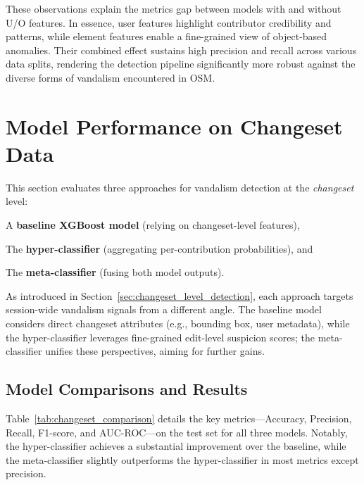 \documentclass[
    13pt, %
    a4paper, %
    listof=totoc, %
    bibliography=totoc, %
    index=totoc, %
    headsepline
]{scrreprt}
\begin{document}
\noindent
These observations explain the metrics gap between models with and without U/O features. In essence, user features highlight contributor credibility and patterns, while element features enable a fine-grained view of object-based anomalies. Their combined effect sustains high precision and recall across various data splits, rendering the detection pipeline significantly more robust against the diverse forms of vandalism encountered in OSM.


\section{Model Performance on Changeset Data}
\label{sec:changeset_level_performance}

This section evaluates three approaches for vandalism detection at the \emph{changeset} level:
\begin{enumerate*}
    \item A \textbf{baseline XGBoost model} (relying on changeset-level features),
    \item The \textbf{hyper-classifier} (aggregating per-contribution probabilities), and
    \item The \textbf{meta-classifier} (fusing both model outputs).
\end{enumerate*}

\vspace{0.5em}
As introduced in Section~\ref{sec:changeset_level_detection}, each approach targets session-wide vandalism signals from a different angle. The baseline model considers direct changeset attributes (e.g., bounding box, user metadata), while the hyper-classifier leverages fine-grained edit-level suspicion scores; the meta-classifier unifies these perspectives, aiming for further gains.

\subsection{Model Comparisons and Results}

Table~\ref{tab:changeset_comparison} details the key metrics—Accuracy, Precision, Recall, F1-score, and AUC-ROC—on the test set for all three models. Notably, the hyper-classifier achieves a substantial improvement over the baseline, while the meta-classifier slightly outperforms the hyper-classifier in most metrics except precision.
\end{document}
